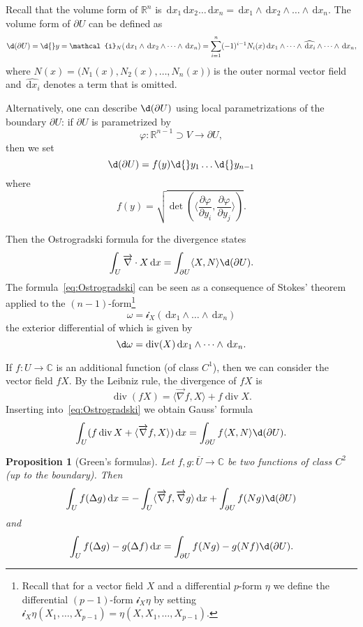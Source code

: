 \documentclass[12pt, oneside, a4paper]{article}
\newtheorem{prop}[thm]{Proposition}
\def\grad{\operatorname{grad}}
\def\divergence{\operatorname{div}}
\theoremstyle{dfn}
\def \grad {\overrightarrow{\nabla}}
\def \div {\overrightarrow{\nabla} \cdot}
\newcommand{\scalprod}[2]{\langle #1,#2 \rangle}
\def\Rbb{\ensuremath{\mathbb{R}}}
\def\dx{\,\mathrm dx}
\newcommand{\Com}{\mathbb{C}}
\begin{document}
Recall that the volume form of $\Rbb^n$ is $\dx_1\dx_2\dots\dx_n = \dx_1 \wedge \dx_2 \wedge \dots \wedge \dx_n$. The volume form of $\partial U$ can be defined as
\[
\d(\partial U) = \d{}y = \mathcal{i}_{N} (\dx_1 \wedge \dx_2 \wedge \dots \wedge \dx_n)
= \sum_{i=1}^n (-1)^{i-1} N_i(x) \dx_1 \wedge \dots \wedge \widehat{\dx_i} \wedge \dots \wedge \dx_n,
\]
where $N(x) = \big( N_1(x), N_2(x), \dots, N_n(x) \big)$ is the outer normal vector field and $\widehat{\dx_i}$ denotes a term that is omitted.

Alternatively, one can describe $\d(\partial U)$ using local parametrizations of the boundary $\partial U$: if $\partial U$ is parametrized by
\[
\varphi \colon \Rbb^{n-1} \supset V \to \partial U,
\]
then we set
\[
\d(\partial U) = f(y) \d{}y_1 \dots \d{}y_{n-1}
\]
where
\[
f(y) = \sqrt{\det \left( \scalprod{\frac{\partial \varphi}{\partial y_i}}{\frac{\partial \varphi}{\partial y_j}} \right) }.
\]

Then the Ostrogradski formula for the divergence states
\begin{equation}\label{eq:Ostrogradski}
\int_U \div X \dx = \int_{\partial U} \scalprod{X}{N} \d(\partial U).
\end{equation}
The formula~\eqref{eq:Ostrogradski} can be seen as a consequence of Stokes' theorem applied to the $(n-1)$-form\footnote{Recall that for a vector field $X$ and a differential $p$-form $\eta$ we define the differential $(p-1)$-form $\mathcal{i}_{X} \eta$ by setting $\mathcal{i}_{X} \eta(X_1, \dots, X_{p-1}) = \eta(X, X_1, \dots, X_{p-1})$.}
\[
\omega = \mathcal{i}_{X} (\dx_1 \wedge \dots \wedge \dx_n)
\]
the exterior differential of which is given by
\[
\d\omega = \divergence (X) \dx_1 \wedge \dots \wedge \dx_n.
\]

If $f \colon U \to \Com$ is an additional function (of class $C^1$), then we can consider the vector field $fX$. By the Leibniz rule, the divergence of $fX$ is
\[
\divergence(fX) = \scalprod{\grad f}{X} + f\divergence X.
\]
Inserting into~\eqref{eq:Ostrogradski} we obtain Gauss' formula
\begin{equation}\label{eq:Gauss}
\int_U (f \divergence X + \scalprod{\grad f}{X}) \dx
= \int_{\partial U} f \scalprod{X}{N} \d(\partial U).
\end{equation}

\begin{prop}[Green's formulas]\label{Prop:GreensFormulas}
Let $f, g \colon \overline{U} \to \Com$ be two functions of class $C^2$ (up to the boundary). Then
\begin{equation}\label{eq:GreenI}
\int_U f(\Delta g) \dx
= - \int_U \scalprod{\grad f}{\grad g} \dx + \int_{\partial U} f (Ng) \d(\partial U)
\end{equation}
and
\begin{equation}\label{eq:GreenII}
\int_U f(\Delta g) - g(\Delta f) \dx
= \int_{\partial U} f (Ng) - g(Nf) \d(\partial U).
\end{equation}
\end{prop}
\end{document}
